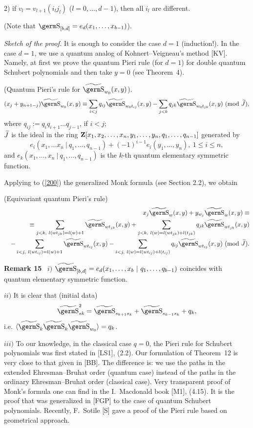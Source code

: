 {{\begin{th}
2) if $v_l=v_{l+1}(i_lj_l)$ ($l=0,\ldots ,d-1$), then all $i_l$ are 
different.
\end{th}
(Note that $\s_{[b,d]}=e_d(x_1,\ldots ,x_{b-1})$).

{\it Sketch of the proof.} It is enough to consider the case $d=1$ 
(induction!). In the 
case $d=1$, we use a quantum analog of Kohnert--Veigneau's method [KV]. 
Namely, at first we prove the quantum Pieri rule (for $d=1$) for 
double quantum Schubert polynomials and then take $y=0$ (see Theorem~4).

\begin{pr} (Quantum Pieri's rule for $\wt{\s}_{w_0}(x,y)$).
\begin{equation} (x_j+y_{n+1-j})\wt{\s}_{w_0}(x,y)\equiv
\sum_{i<j}q_{ij}\wt{\s}_{w_0t_{ij}}(x,y)-\sum_{j<k}q_{jk}
\wt{\s}_{w_0t_{jk}}(x,y)\ (\mod \wt J), \label{200}
\end{equation}
where $q_{ij}:=q_iq_{i+1}\ldots q_{j-1}$, if $i<j$;\\ 
$\widetilde J$ is the ideal in the ring 
${\bf Z}[x_1,x_2,\ldots ,x_n,y_1,\ldots ,y_n,q_1,\ldots ,q_{n-1}]$ 
generated by
$$e_i(x_1,\ldots x_n~|~q_1,\ldots ,q_{n-1})+(-1)^{i-1}e_i(y_1,\ldots ,y_n),
\ 1\le i\le n,
$$
and $e_k(x_1,\ldots ,x_n~|~q_1,\ldots ,q_{n-1})$ is the $k$-th quantum 
elementary symmetric function.
\end{pr}

Applying to (\ref{200}) the generalized Monk formula (see Section 2.2), 
we obtain
\begin{col} (Equivariant quantum Pieri's rule)
\begin{eqnarray*}& &x_j\wt{\s}_w(x,y)+y_{w_j}\wt{\s}_w(x,y)\equiv\\
& &\equiv \sum_{j<k,~l(wt_{jk})=l(w)+1}\wt{\s}_{wt_{jk}}(x,y)+
\sum_{j<k,~l(w)=l(wt_{jk})+l(t_{jk})}q_{jk}\wt{\s}_{wt_{jk}}(x,y) \\
& &-\sum_{i<j,~l(wt_{ij})=l(w)+1}\wt{\s}_{wt_{ij}}(x,y)-
\sum_{i<j,~l(w)=l(wt_{ij})+l(t_{ij})}q_{ij}\wt{\s}_{wt_{ij}}(x,y)\ 
(\mod \wt J).
\end{eqnarray*}
\end{col}
\vskip 0.3cm
{\bf Remark 15} \  
$i)$ $\wt{\s}_{[b,d]}=e_d(x_1,\ldots ,x_b~|~q_1,\ldots ,q_{b-1})$ 
coincides with quantum elementary symmetric function.

$ii)$ It is clear that (initial data) 
$$\wt{\s}_{sk}^2=\wt{\s}_{s_{k+1}s_k}+\wt{\s}_{s_{k-1}s_k}+q_k,
$$ 
i.e. $\langle\wt{\s}_k\wt{\s}_k\wt{\s}_{w_0}\rangle =q_k$.

$iii)$ To our knowledge, in the classical case $q=0$, the Pieri rule for
Schubert polynomials was first stated in [LS1], (2.2). Our formulation
of Theorem~12 is very close to that given in [BB]. The difference is:
we use the paths in the extended Ehresman--Bruhat order (quantum case)
instead of the paths in the ordinary Ehresman--Bruhat order (classical
case). Very transparent proof of Monk's formula one can find in the
I.~Macdonald book [M1], (4.15). It is the proof that was generalized
in [FGP] to the case of quantum Schubert polynomials. Recently, F.~Sotile
[S] gave a proof of the Pieri rule based on geometrical approach.

}}
